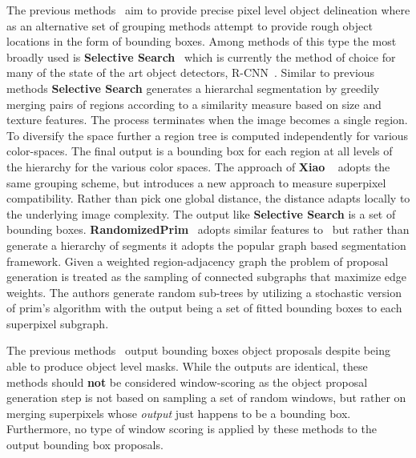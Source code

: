 The previous methods~\cite{Malisiewicz:Efros:BMVC07,Arbelaez:etal:CVPR14,Bonev:Yuille:ECCV14} aim to provide precise pixel level object delineation where as an alternative set of grouping methods attempt to provide rough object locations in the form of bounding boxes. Among methods of this type the most broadly used is {\bf Selective Search}~\cite{Uijlings:etal:IJCV13} which is currently the method of choice for many of the state of the art object detectors, R-CNN~\cite{Girshick:etal:PAMI16}. Similar to previous methods {\bf Selective Search} generates a hierarchal segmentation by greedily merging pairs of regions according to a similarity measure based on size and texture features. The process terminates when the image becomes a single region. To diversify the space further a region tree is computed independently for various color-spaces. The final output is a bounding box for each region at all levels of the hierarchy for the various color spaces. The approach of {\bf Xiao} \etal~\cite{Xiao:Lu:etal:CVPR15} adopts the same grouping scheme, but introduces a new approach to measure superpixel compatibility. Rather than pick one global distance, the distance adapts locally to the underlying image complexity. The output like {\bf Selective Search} is a set of bounding boxes. {\bf RandomizedPrim}~\cite{Manen:etal:ICCV13} adopts similar features to~\cite{Uijlings:etal:IJCV13} but rather than generate a hierarchy of segments it adopts the popular graph based segmentation framework. Given a weighted region-adjacency graph the problem of proposal generation is treated as the sampling of connected subgraphs that maximize edge weights. The authors generate random sub-trees by utilizing a stochastic version of prim's algorithm with the output being a set of fitted bounding boxes to each superpixel subgraph. 

The previous methods~\cite{Uijlings:etal:IJCV13,Xiao:Lu:etal:CVPR15,Manen:etal:ICCV13} output bounding boxes object proposals despite being able to produce object level masks. While the outputs are identical, these methods should {\bf not} be considered window-scoring as the object proposal generation step is not based on sampling a set of random windows, but rather on merging superpixels whose \emph{output} just happens to be a bounding box. Furthermore, no type of window scoring is applied by these methods to the output bounding box proposals. 

